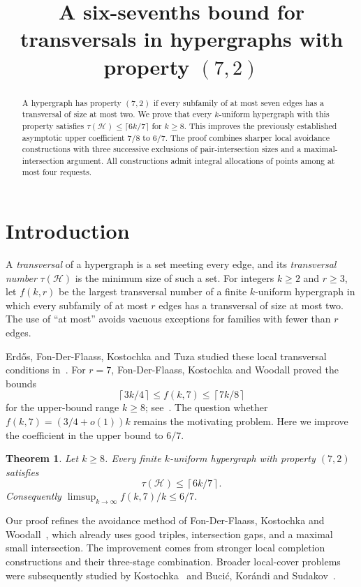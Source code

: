 \documentclass[11pt]{article}
\title{A six-sevenths bound for transversals in hypergraphs with property $(7,2)$}
\author{}
\date{}
\numberwithin{equation}{section}
\newtheorem{theorem}{Theorem}[section]
\theoremstyle{definition}
\theoremstyle{remark}
\newcommand{\HH}{\mathcal H}
\newcommand{\ceil}[1]{\left\lceil #1\right\rceil}
\begin{document}
\maketitle
\begin{abstract}
A hypergraph has property $(7,2)$ if every subfamily of at most seven
edges has a transversal of size at most two. We prove that every
$k$-uniform hypergraph with this property satisfies
$\tau(\HH)\le\lceil6k/7\rceil$ for $k\ge8$.
This improves the previously established asymptotic upper coefficient
$7/8$ to $6/7$. The proof combines sharper local avoidance constructions
with three successive exclusions of pair-intersection sizes and a
maximal-intersection argument. All constructions admit integral
allocations of points among at most four requests.
\end{abstract}

\section{Introduction}
A \emph{transversal} of a hypergraph is a set meeting every edge, and its
\emph{transversal number} $\tau(\HH)$ is the minimum size of such a set.
For integers $k\ge2$ and $r\ge3$, let $f(k,r)$ be the largest transversal
number of a finite $k$-uniform hypergraph in which every subfamily of at
most $r$ edges has a transversal of size at most two. The use of ``at most''
avoids vacuous exceptions for families with fewer than $r$ edges.

Erd\H{o}s, Fon-Der-Flaass, Kostochka and Tuza studied these local
transversal conditions in~\cite{EFKT}. For $r=7$, Fon-Der-Flaass,
Kostochka and Woodall proved the bounds
\[
 \ceil{3k/4}\le f(k,7)\le\ceil{7k/8}
\]
for the upper-bound range $k\ge8$; see~\cite{FKW}.
The question whether $f(k,7)=(3/4+o(1))k$ remains the motivating problem.
Here we improve the coefficient in the upper bound to $6/7$.

\begin{theorem}\label{thm:main}
Let $k\ge8$. Every finite $k$-uniform hypergraph with property $(7,2)$
satisfies
\[
 \tau(\HH)\le\ceil{6k/7}.
\]
Consequently $\limsup_{k\to\infty}f(k,7)/k\le6/7$.
\end{theorem}

Our proof refines the avoidance method of Fon-Der-Flaass, Kostochka
and Woodall~\cite{FKW}, which already uses good triples, intersection
gaps, and a maximal small intersection. The improvement comes from
stronger local completion constructions and their three-stage
combination. Broader local-cover problems were subsequently studied
by Kostochka~\cite{Kostochka} and Buci\'c, Kor\'andi and Sudakov~\cite{BKS}.
\end{document}
